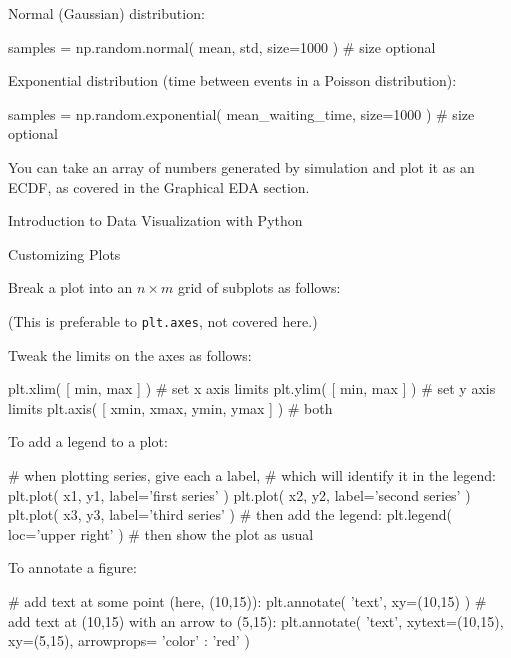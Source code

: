 \documentclass[a4paper,landscape,columns=3]{cheatsheet}
\def\chap#1{\vspace{5mm}\begin{tcolorbox}[colback=red!5!white,colframe=red!75!black,leftrule=3mm]
    \Large #1
\end{tcolorbox}}
\def\sect#1{\begin{tcolorbox}[colback=blue!5!white,colframe=blue!75!black,size=title,leftrule=2mm]
    \large #1
\end{tcolorbox}}
\begin{document}
Normal (Gaussian) distribution:
\begin{python}
samples = np.random.normal(
    mean, std, size=1000 )          # size optional
\end{python}

Exponential distribution (time between events in a Poisson distribution):
\begin{python}
samples = np.random.exponential(
    mean_waiting_time, size=1000 )  # size optional
\end{python}

You can take an array of numbers generated by simulation and plot it as an ECDF, as covered in the Graphical EDA section.

\chap{Introduction to Data Visualization with Python}

\sect{Customizing Plots}

Break a plot into an $n\times m$ grid of subplots as follows:

(This is preferable to \lstinline{plt.axes}, not covered here.)

Tweak the limits on the axes as follows:
\begin{python}
plt.xlim( [ min, max ] )  # set x axis limits
plt.ylim( [ min, max ] )  # set y axis limits
plt.axis( [ xmin, xmax, ymin, ymax ] ) # both
\end{python}

To add a legend to a plot:
\begin{python}
# when plotting series, give each a label,
# which will identify it in the legend:
plt.plot( x1, y1, label='first series' )
plt.plot( x2, y2, label='second series' )
plt.plot( x3, y3, label='third series' )
# then add the legend:
plt.legend( loc='upper right' )
# then show the plot as usual
\end{python}

To annotate a figure:
\begin{python}
# add text at some point (here, (10,15)):
plt.annotate( 'text', xy=(10,15) )
# add text at (10,15) with an arrow to (5,15):
plt.annotate( 'text', xytext=(10,15), xy=(5,15),
              arrowprops={ 'color' : 'red' } )
\end{python}
\end{document}
